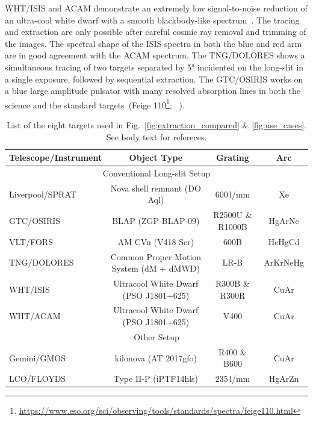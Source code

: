 \documentclass[twocolumn, linenumbers]{aastex631}
\begin{document}
WHT/ISIS and ACAM demonstrate an extremely low signal-to-noise reduction of an ultra-cool
white dwarf with a smooth blackbody-like spectrum~\citep{2020MNRAS.493.6001L}.
The tracing and extraction are only possible after careful cosmic ray removal
and trimming of the images. The spectral shape of the ISIS spectra in both the
blue and red arm are in good agreement with the ACAM spectrum. The TNG/DOLORES
shows a simultaneous tracing of two targets separated by 5" incidented on the
long-slit in a single exposure, followed by sequential extraction. The
GTC/OSIRIS works on a blue large amplitude pulsator with many resolved
absorption lines in both the science and the standard targets~(Feige
110\footnote{\url{https://www.eso.org/sci/observing/tools/standards/spectra/feige110.html}}; ~\citealp{2022MNRAS.511.4971M}). 

\begin{table}
    \centering
    \begin{tabular}{l|c|c|c}\hline
        Telescope/Instrument & Object Type                                 & Grating             & Arc \\\hline\hline
        \multicolumn{4}{c}{Conventional Long-slit Setup}\\\hline
        Liverpool/SPRAT      & Nova shell remnant (DO Aql)                 & 600\,l/mm           & Xe \\
        GTC/OSIRIS           & BLAP (ZGP-BLAP-09)                          & R2500U \& R1000B    & HgArNe \\
        VLT/FORS             & AM CVn (V418 Ser)                           & 600B                & HeHgCd \\
        TNG/DOLORES          & Common Proper Motion System (dM + dMWD)     & LR-B                & ArKrNeHg \\
        WHT/ISIS             & Ultracool White Dwarf (PSO J1801+625)       & R300B \& R300R      & CuAr \\
        WHT/ACAM             & Ultracool White Dwarf (PSO J1801+625)       & V400                & CuAr \\\hline
        \multicolumn{4}{c}{Other Setup}\\\hline
        Gemini/GMOS          & kilonova (AT 2017gfo)                       & R400 \& B600        & CuAr \\
        LCO/FLOYDS           & Type II-P (iPTF14hls)                       & 235\,l/mm           & HgArZn \\\hline
\end{tabular}
    \caption{List of the eight targets used in Fig.~\ref{fig:extraction_compared} \& \ref{fig:use_cases}. See body text for refereces.}
    \label{tab:my_label}
\end{table}
\end{document}
